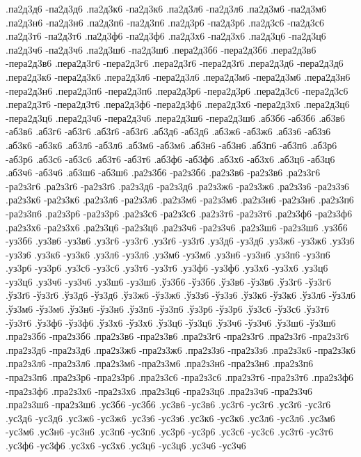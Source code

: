 {.па2д3д6 -па2д3д6
.па2д3к6 -па2д3к6
.па2д3л6 -па2д3л6
.па2д3м6 -па2д3м6
.па2д3н6 -па2д3н6
.па2д3п6 -па2д3п6
.па2д3р6 -па2д3р6
.па2д3с6 -па2д3с6
.па2д3т6 -па2д3т6
.па2д3ф6 -па2д3ф6
.па2д3х6 -па2д3х6
.па2д3ц6 -па2д3ц6
.па2д3ч6 -па2д3ч6
.па2д3ш6 -па2д3ш6
.пера2д3б6 -пера2д3б6
.пера2д3в6 -пера2д3в6
.пера2д3г6 -пера2д3г6
.пера2д3ґ6 -пера2д3ґ6
.пера2д3д6 -пера2д3д6
.пера2д3к6 -пера2д3к6
.пера2д3л6 -пера2д3л6
.пера2д3м6 -пера2д3м6
.пера2д3н6 -пера2д3н6
.пера2д3п6 -пера2д3п6
.пера2д3р6 -пера2д3р6
.пера2д3с6 -пера2д3с6
.пера2д3т6 -пера2д3т6
.пера2д3ф6 -пера2д3ф6
.пера2д3х6 -пера2д3х6
.пера2д3ц6 -пера2д3ц6
.пера2д3ч6 -пера2д3ч6
.пера2д3ш6 -пера2д3ш6
.аб3б6 -аб3б6
.аб3в6 -аб3в6
.аб3г6 -аб3г6
.аб3ґ6 -аб3ґ6
.аб3д6 -аб3д6
.аб3ж6 -аб3ж6
.аб3з6 -аб3з6
.аб3к6 -аб3к6
.аб3л6 -аб3л6
.аб3м6 -аб3м6
.аб3н6 -аб3н6
.аб3п6 -аб3п6
.аб3р6 -аб3р6
.аб3с6 -аб3с6
.аб3т6 -аб3т6
.аб3ф6 -аб3ф6
.аб3х6 -аб3х6
.аб3ц6 -аб3ц6
.аб3ч6 -аб3ч6
.аб3ш6 -аб3ш6
.ра2з3б6 -ра2з3б6
.ра2з3в6 -ра2з3в6
.ра2з3г6 -ра2з3г6
.ра2з3ґ6 -ра2з3ґ6
.ра2з3д6 -ра2з3д6
.ра2з3ж6 -ра2з3ж6
.ра2з3з6 -ра2з3з6
.ра2з3к6 -ра2з3к6
.ра2з3л6 -ра2з3л6
.ра2з3м6 -ра2з3м6
.ра2з3н6 -ра2з3н6
.ра2з3п6 -ра2з3п6
.ра2з3р6 -ра2з3р6
.ра2з3с6 -ра2з3с6
.ра2з3т6 -ра2з3т6
.ра2з3ф6 -ра2з3ф6
.ра2з3х6 -ра2з3х6
.ра2з3ц6 -ра2з3ц6
.ра2з3ч6 -ра2з3ч6
.ра2з3ш6 -ра2з3ш6
.уз3б6 -уз3б6
.уз3в6 -уз3в6
.уз3г6 -уз3г6
.уз3ґ6 -уз3ґ6
.уз3д6 -уз3д6
.уз3ж6 -уз3ж6
.уз3з6 -уз3з6
.уз3к6 -уз3к6
.уз3л6 -уз3л6
.уз3м6 -уз3м6
.уз3н6 -уз3н6
.уз3п6 -уз3п6
.уз3р6 -уз3р6
.уз3с6 -уз3с6
.уз3т6 -уз3т6
.уз3ф6 -уз3ф6
.уз3х6 -уз3х6
.уз3ц6 -уз3ц6
.уз3ч6 -уз3ч6
.уз3ш6 -уз3ш6
.ўз3б6 -ўз3б6
.ўз3в6 -ўз3в6
.ўз3г6 -ўз3г6
.ўз3ґ6 -ўз3ґ6
.ўз3д6 -ўз3д6
.ўз3ж6 -ўз3ж6
.ўз3з6 -ўз3з6
.ўз3к6 -ўз3к6
.ўз3л6 -ўз3л6
.ўз3м6 -ўз3м6
.ўз3н6 -ўз3н6
.ўз3п6 -ўз3п6
.ўз3р6 -ўз3р6
.ўз3с6 -ўз3с6
.ўз3т6 -ўз3т6
.ўз3ф6 -ўз3ф6
.ўз3х6 -ўз3х6
.ўз3ц6 -ўз3ц6
.ўз3ч6 -ўз3ч6
.ўз3ш6 -ўз3ш6
.пра2з3б6 -пра2з3б6
.пра2з3в6 -пра2з3в6
.пра2з3г6 -пра2з3г6
.пра2з3ґ6 -пра2з3ґ6
.пра2з3д6 -пра2з3д6
.пра2з3ж6 -пра2з3ж6
.пра2з3з6 -пра2з3з6
.пра2з3к6 -пра2з3к6
.пра2з3л6 -пра2з3л6
.пра2з3м6 -пра2з3м6
.пра2з3н6 -пра2з3н6
.пра2з3п6 -пра2з3п6
.пра2з3р6 -пра2з3р6
.пра2з3с6 -пра2з3с6
.пра2з3т6 -пра2з3т6
.пра2з3ф6 -пра2з3ф6
.пра2з3х6 -пра2з3х6
.пра2з3ц6 -пра2з3ц6
.пра2з3ч6 -пра2з3ч6
.пра2з3ш6 -пра2з3ш6
.ус3б6 -ус3б6
.ус3в6 -ус3в6
.ус3г6 -ус3г6
.ус3ґ6 -ус3ґ6
.ус3д6 -ус3д6
.ус3ж6 -ус3ж6
.ус3з6 -ус3з6
.ус3к6 -ус3к6
.ус3л6 -ус3л6
.ус3м6 -ус3м6
.ус3н6 -ус3н6
.ус3п6 -ус3п6
.ус3р6 -ус3р6
.ус3с6 -ус3с6
.ус3т6 -ус3т6
.ус3ф6 -ус3ф6
.ус3х6 -ус3х6
.ус3ц6 -ус3ц6
.ус3ч6 -ус3ч6
}
